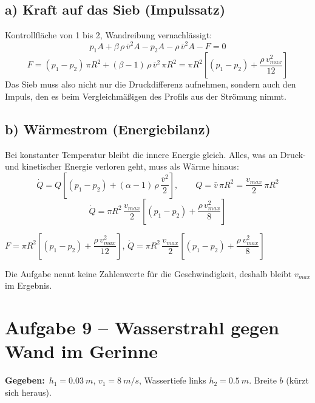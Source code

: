 \documentclass[11pt,a4paper]{article}
\newcommand{\gegeben}{\textbf{Gegeben:}\ }
\begin{document}
\subsection*{a) Kraft auf das Sieb (Impulssatz)}

Kontrollfläche von 1 bis 2, Wandreibung vernachlässigt:
\[
p_1 A + \beta\,\rho\,\bar v^2 A - p_2 A - \rho\,\bar v^2 A - F = 0
\]
\[
F = (p_1 - p_2)\,\pi R^2 + (\beta - 1)\,\rho\,\bar v^2\,\pi R^2 = \pi R^2\left[(p_1 - p_2) + \frac{\rho\,v_{max}^2}{12}\right]
\]
Das Sieb muss also nicht nur die Druckdifferenz aufnehmen, sondern auch den Impuls, den es beim Vergleichmäßigen des Profils aus der Strömung nimmt.

\subsection*{b) Wärmestrom (Energiebilanz)}

Bei konstanter Temperatur bleibt die innere Energie gleich. Alles, was an Druck- und kinetischer Energie verloren geht, muss als Wärme hinaus:
\[
\dot Q = Q\left[(p_1 - p_2) + (\alpha - 1)\,\rho\,\frac{\bar v^2}{2}\right],
\qquad Q = \bar v\,\pi R^2 = \frac{v_{max}}{2}\,\pi R^2
\]
\[
\dot Q = \pi R^2\,\frac{v_{max}}{2}\left[(p_1 - p_2) + \frac{\rho\,v_{max}^2}{8}\right]
\]

\begin{ergebnis}
$F = \pi R^2\left[(p_1 - p_2) + \dfrac{\rho\,v_{max}^2}{12}\right]$, \qquad
$\dot Q = \pi R^2\,\dfrac{v_{max}}{2}\left[(p_1 - p_2) + \dfrac{\rho\,v_{max}^2}{8}\right]$
\par\smallskip
Die Aufgabe nennt keine Zahlenwerte für die Geschwindigkeit, deshalb bleibt $v_{max}$ im Ergebnis.
\end{ergebnis}

\section{Aufgabe 9 -- Wasserstrahl gegen Wand im Gerinne}

\begin{bild}

\end{bild}

\gegeben $h_1 = \SI{0.03}{m}$, $v_1 = \SI{8}{m/s}$, Wassertiefe links $h_2 = \SI{0.5}{m}$. Breite $b$ (kürzt sich heraus).
\end{document}
